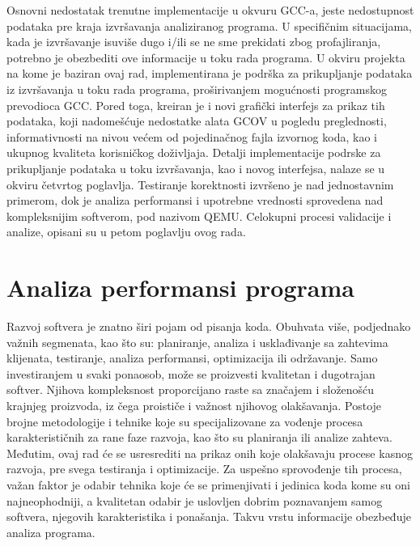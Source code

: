 \documentclass[12pt,oneside]{memoir}
\begin{document}
Osnovni nedostatak trenutne implementacije u okvuru GCC-a, jeste nedostupnost podataka pre kraja izvršavanja analiziranog programa. U specifičnim situacijama, kada je izvršavanje isuviše dugo i/ili se ne sme prekidati zbog profajliranja, potrebno je obezbediti ove informacije u toku rada programa. U okviru projekta na kome je baziran ovaj rad, implementirana je podrška za prikupljanje podataka iz izvršavanja u toku rada programa, proširivanjem mogućnosti programskog prevodioca GCC. Pored toga, kreiran je i novi grafički interfejs za prikaz tih podataka, koji nadomešćuje nedostatke alata GCOV u pogledu preglednosti, informativnosti na nivou većem od pojedinačnog fajla izvornog koda, kao i ukupnog kvaliteta korisničkog doživljaja. Detalji implementacije podrske za prikupljanje podataka u toku izvršavanja, kao i novog interfejsa, nalaze se u okviru četvrtog poglavlja. Testiranje korektnosti izvršeno je nad jednostavnim primerom, dok je analiza performansi i upotrebne vrednosti sprovedena nad kompleksnijim softverom, pod nazivom QEMU. Celokupni procesi validacije i analize, opisani su u petom poglavlju ovog rada. 

\chapter{Analiza performansi programa}


Razvoj softvera je znatno širi pojam od pisanja koda. Obuhvata više, podjednako važnih segmenata, kao što su: planiranje, analiza i usklađivanje sa zahtevima klijenata, testiranje, analiza performansi, optimizacija ili održavanje. Samo investiranjem u svaki ponaosob, može se proizvesti kvalitetan i dugotrajan softver. Njihova kompleksnost proporcijano raste sa značajem i složenošću krajnjeg proizvoda, iz čega proističe i važnost njihovog olakšavanja. Postoje brojne metodologije i tehnike koje su specijalizovane za vođenje procesa karakterističnih za rane faze razvoja, kao što su planiranja ili analize zahteva. Međutim, ovaj rad će se usresrediti na prikaz onih koje olakšavaju procese kasnog razvoja, pre svega testiranja i optimizacije. Za uspešno sprovođenje tih procesa, važan faktor je odabir tehnika koje će se primenjivati i jedinica koda kome su oni najneophodniji, a kvalitetan odabir je uslovljen dobrim poznavanjem samog softvera, njegovih karakteristika i ponašanja. Takvu vrstu informacije obezbeđuje analiza programa.
\end{document}
